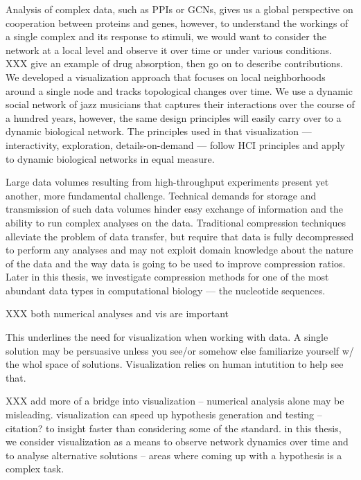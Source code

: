 
Analysis of complex data, such as PPIs or GCNs, gives us a global perspective on cooperation between proteins and genes, however, to understand the workings of a single complex and its response to stimuli, we would want to consider the network at a local level and observe it over time or under various conditions. XXX give an example of drug absorption, then go on to describe contributions. 
We developed a visualization approach that focuses on local neighborhoods around a single node and tracks topological changes over time. We use a dynamic social network of jazz musicians that captures their interactions over the course of a hundred years, however, the same design principles will easily carry over to a dynamic biological network. The principles used in that visualization --- interactivity, exploration, details-on-demand --- follow HCI principles and apply to dynamic biological networks in equal measure.


Large data volumes resulting from high-throughput experiments present yet another, more fundamental challenge. Technical demands for storage and transmission of such data volumes hinder easy exchange of information and the ability to run complex analyses on the data. Traditional compression techniques alleviate the problem of data transfer, but require that data is fully decompressed to perform any analyses and may not exploit domain knowledge about the nature of the data and the way data is going to be used to improve compression ratios. Later in this thesis, we investigate compression methods for one of the most abundant data types in computational biology --- the nucleotide sequences.


XXX both numerical analyses and vis are important

This underlines the need for visualization when working with data. A single solution may be persuasive unless you see/or somehow else familiarize yourself w/ the whol space of solutions. Visualization relies on human intutition to help see that.

XXX add more of a bridge into visualization -- numerical analysis alone may be misleading. visualization can speed up hypothesis generation and testing -- citation? to insight faster than considering some of the standard. in this thesis, we consider visualization as a means to observe network dynamics over time and to analyse alternative solutions -- areas where coming up with a hypothesis is a complex task.

